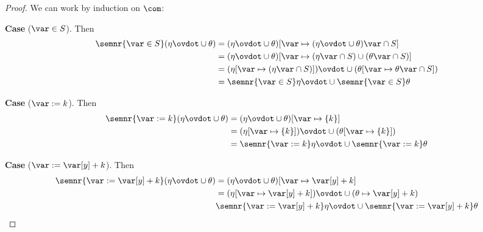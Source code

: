 \begin{proof}
  We can work by induction on \(\com\):

  \medskip
  
  \noindent
  \textbf{Case}  (\(\var \in S\)).
  Then
  \begin{align*}
    \semnr{\var \in S}(\eta \ovdot\cup \theta) & = (\eta \ovdot\cup \theta)[\var \mapsto (\eta \ovdot\cup \theta)\var \cap S] \\
                                               & = (\eta \ovdot\cup \theta)[\var \mapsto (\eta\var \cap S) \cup (\theta\var \cap S)] \\
                                               & = (\eta[\var \mapsto (\eta\var \cap S)]) \ovdot\cup (\theta[\var \mapsto \theta\var \cap S]) \\
                                               & = \semnr{\var \in S}\eta \ovdot\cup \semnr{\var \in S}\theta
  \end{align*}
  
  \medskip

  \noindent
  \textbf{Case}  (\(\var := k\)).
  Then
  \begin{align*}
    \semnr{\var := k}(\eta \ovdot\cup \theta) & = (\eta \ovdot\cup \theta)[\var \mapsto \{k\}] \\
                                              & = (\eta[\var \mapsto \{k\}]) \ovdot\cup (\theta[\var \mapsto \{k\}]) \\
                                              & = \semnr{\var := k}\eta \ovdot\cup \semnr{\var := k}\theta
  \end{align*}

  \medskip

  \noindent
  \textbf{Case}  (\(\var := \var[y] + k\)).
  Then
  \begin{align*}
    \semnr{\var := \var[y] + k}(\eta \ovdot\cup \theta) & = (\eta \ovdot\cup \theta)[\var \mapsto \var[y] + k] \\
                                                        & = (\eta[\var \mapsto \var[y] + k]) \ovdot\cup (\theta \mapsto \var[y] + k) \\
                                                        & \semnr{\var := \var[y] + k}\eta \ovdot\cup \semnr{\var := \var[y] + k}\theta
  \end{align*}


\end{proof}
